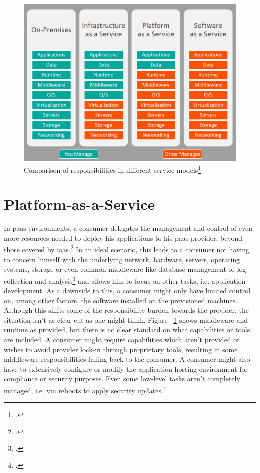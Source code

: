 \begin{figure}[H]
\includegraphics[scale=0.4]{pictures/ServiceComparison.jpg} 
\caption{Comparison of responsibilities in different service models\protect\footcite[][, section 'Original reference image']{servicecomparison}}
\label{fig:servicecomparison}
\end{figure}

\section{Platform-as-a-Service}

In \gls{paas} environments, a consumer delegates the management and control of even more resources needed to deploy his applications to his \gls{paas} provider, beyond those covered by \gls{iaas}.\footcite[][p. 2 to 3]{nistcloud}
In an ideal scenario, this leads to a consumer not having to concern himself with the underlying network, hardware, servers, operating systems, storage or even common middleware like database management or log collection and analysis\footcite[][, section 'Advantages of PaaS']{msPaas} and allows him to focus on other tasks, i.e. application development.
As a downside to this, a consumer might only have limited control on, among other factors, the software installed on the provisioned machines. 
Although this shifts some of the responsibility burden towards the provider, the situation isn't as clear-cut as one might think. 
Figure ~\ref{fig:servicecomparison} shows middleware and runtime as provided, but there is no clear standard on what capabilities or tools are included.
A consumer might require capabilities which aren't provided or wishes to avoid provider lock-in through proprietary tools, 
resulting in some middleware responsibilities falling back to the consumer. 
A consumer might also have to extensively configure or modify the application-hosting environment for compliance or security purposes. 
Even some low-level tasks aren't completely managed, i.e. \gls{vm} reboots to apply security updates.\footcite[][, section 'Process Linux node updates and reboots using kured']{msVmReboot}

